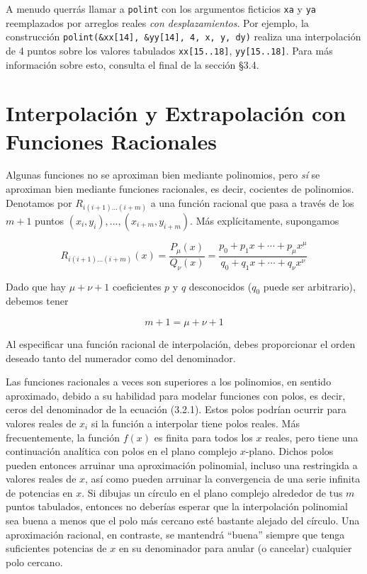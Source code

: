 \documentclass[10pt,a4paper]{book}
\begin{document}
A menudo querrás llamar a \texttt{polint} con los argumentos ficticios \texttt{xa} y \texttt{ya} reemplazados por arreglos reales \emph{con desplazamientos}. Por ejemplo, la construcción \texttt{polint(\&xx[14], \&yy[14], 4, x, y, dy)} realiza una interpolación de 4 puntos sobre los valores tabulados \texttt{xx[15..18]}, \texttt{yy[15..18]}. Para más información sobre esto, consulta el final de la sección §3.4.

\newpage

\section{Interpolación y Extrapolación con Funciones Racionales}

Algunas funciones no se aproximan bien mediante polinomios, pero \emph{sí} se aproximan bien mediante funciones racionales, es decir, cocientes de polinomios. Denotamos por $R_{i(i+1)\ldots(i+m)}$ a una función racional que pasa a través de los $m+1$ puntos $(x_i, y_i), \ldots, (x_{i+m}, y_{i+m})$. Más explícitamente, supongamos

\begin{equation}
R_{i(i+1)\ldots(i+m)}(x) = \frac{P_\mu(x)}{Q_\nu(x)} = \frac{p_0 + p_1 x + \cdots + p_\mu x^\mu}{q_0 + q_1 x + \cdots + q_\nu x^\nu}
\end{equation}

Dado que hay $\mu + \nu + 1$ coeficientes $p$ y $q$ desconocidos ($q_0$ puede ser arbitrario), debemos tener

\begin{equation}
m + 1 = \mu + \nu + 1
\end{equation}

Al especificar una función racional de interpolación, debes proporcionar el orden deseado tanto del numerador como del denominador.

Las funciones racionales a veces son superiores a los polinomios, en sentido aproximado, debido a su habilidad para modelar funciones con polos, es decir, ceros del denominador de la ecuación (3.2.1). Estos polos podrían ocurrir para valores reales de $x_i$ si la función a interpolar tiene polos reales. Más frecuentemente, la función $f(x)$ es finita para todos los $x$ reales, pero tiene una continuación analítica con polos en el plano complejo $x$-plano. Dichos polos pueden entonces arruinar una aproximación polinomial, incluso una restringida a valores reales de $x$, así como pueden arruinar la convergencia de una serie infinita de potencias en $x$. Si dibujas un círculo en el plano complejo alrededor de tus $m$ puntos tabulados, entonces no deberías esperar que la interpolación polinomial sea buena a menos que el polo más cercano esté bastante alejado del círculo. Una aproximación racional, en contraste, se mantendrá “buena” siempre que tenga suficientes potencias de $x$ en su denominador para anular (o cancelar) cualquier polo cercano.
\end{document}
